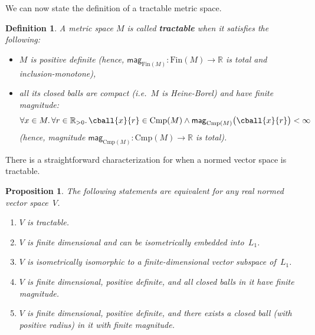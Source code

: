 \documentclass[11pt]{article}
\theoremstyle{plain}
\newtheorem{proposition}[theorem]{Proposition}
\newtheorem{definition}[theorem]{Definition}
\theoremstyle{definition}
\newcommand{\all}[1]{\forall #1 .\,}  %
\newcommand{\df}[1]{\emph{\textbf{#1}}}  %
\newcommand{\RR}{\mathbb{R}}
\newcommand{\mg}[1][]{\mathsf{mag}_{#1}}
\newcommand{\fsub}{\mathrm{Fin}}
\newcommand{\csub}{\mathrm{Cmp}}
\begin{document}
We can now state the definition of a tractable metric space.

\begin{definition}
A metric space $M$ is called \df{tractable} when it satisfies the following:
\begin{itemize}
\item
$M$ is positive definite (hence, $\mg[\fsub(M)]\colon \fsub(M) \to \RR$ is total and inclusion-monotone),
\item
all its closed balls are compact (i.e.~$M$ is Heine-Borel) and have finite magnitude:
\[\all{x \in M}\all{r \in \RR_{> 0}}{\cball{x}{r} \in \csub(M) \land \mg[\csub(M)]\big(\cball{x}{r}\big) < \infty}\]
(hence, magnitude $\mg[\csub(M)]\colon \csub(M) \to \RR$ is total).
\end{itemize}
\end{definition}

There is a straightforward characterization for when a normed vector space is tractable.

\begin{proposition}\label{proposition:tractable-normed-spaces}
The following statements are equivalent for any real normed vector space~$V$.
\begin{enumerate}[label=(\roman*)]
\item
$V$ is tractable.
\item
$V$ is finite dimensional and can be isometrically embedded into~$L_1$.
\item
$V$ is isometrically isomorphic to a finite-dimensional vector subspace of~$L_1$.
\item
$V$ is finite dimensional, positive definite, and all closed balls in it have finite magnitude.
\item
$V$ is finite dimensional, positive definite, and there exists a closed ball (with positive radius) in it with finite magnitude.
\end{enumerate}
\end{proposition}
\end{document}
